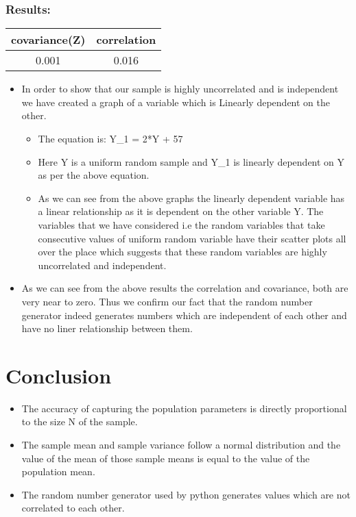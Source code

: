 \documentclass[11pt]{article}
\providecommand{\tightlist}{%
      \setlength{\itemsep}{0pt}\setlength{\parskip}{0pt}}
\begin{document}
    \subsubsection{Results:}\label{results}

\begin{longtable}[]{@{}cc@{}}
\toprule
covariance(Z) & correlation\tabularnewline
\midrule
\endhead
0.001 & 0.016\tabularnewline
\bottomrule
\end{longtable}

\begin{itemize}
\tightlist
\item
  In order to show that our sample is highly uncorrelated and is
  independent we have created a graph of a variable which is Linearly
  dependent on the other.

  \begin{itemize}
  \tightlist
  \item
    The equation is: Y\_1 = 2*Y + 57
  \item
    Here Y is a uniform random sample and Y\_1 is linearly dependent on
    Y as per the above equation.
  \item
    As we can see from the above graphs the linearly dependent variable
    has a linear relationship as it is dependent on the other variable
    Y. The variables that we have considered i.e the random variables
    that take consecutive values of uniform random variable have their
    scatter plots all over the place which suggests that these random
    variables are highly uncorrelated and independent.
  \end{itemize}
\item
  As we can see from the above results the correlation and covariance,
  both are very near to zero. Thus we confirm our fact that the random
  number generator indeed generates numbers which are independent of
  each other and have no liner relationship between them.
\end{itemize}

    \section{Conclusion}\label{conclusion}

\begin{itemize}
\tightlist
\item
  The accuracy of capturing the population parameters is directly
  proportional to the size N of the sample.
\item
  The sample mean and sample variance follow a normal distribution and
  the value of the mean of those sample means is equal to the value of
  the population mean.
\item
  The random number generator used by python generates values which are
  not correlated to each other.
\end{itemize}


    
    
    
    
\end{document}
